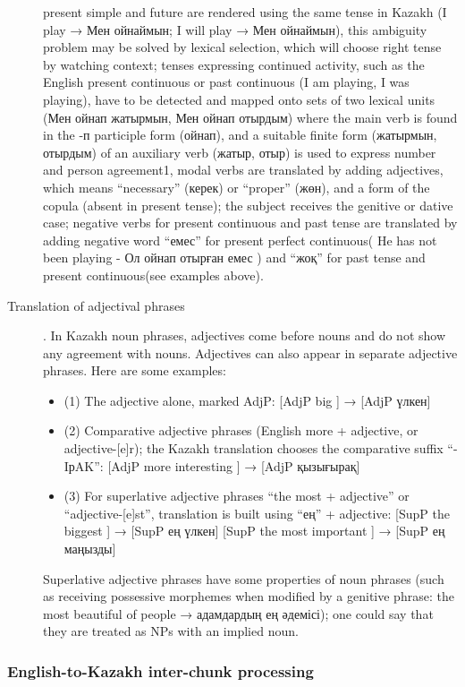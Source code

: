 \documentclass[11pt]{article}
\begin{document}
\begin{description}
present simple and future are rendered using the same tense in Kazakh (I play → Мен ойнаймын;  I will play → Мен ойнаймын), this ambiguity problem may be solved by lexical selection, which will choose right tense by watching context; 
tenses expressing continued activity, such as the English present continuous or past continuous (I am playing, I was playing), have to be detected and mapped onto sets of two lexical units (Мен ойнап жатырмын, Мен ойнап отырдым) where the main verb is found in the -п participle form (ойнап), and a suitable finite form  (жатырмын, отырдым) of an auxiliary verb (жатыр, отыр) is used to express number and person agreement1, 
modal verbs are translated by adding adjectives, which means “necessary” (керек) or “proper” (жөн), and a form of the copula (absent in present tense); the subject receives the genitive or dative case;
negative verbs for present continuous and past tense are translated by adding negative word “емес” for present perfect continuous( He has not been playing - Ол ойнап отырған емес ) and  “жоқ” for past tense and present continuous(see examples above).
\item[Translation of adjectival phrases]. In Kazakh noun phrases, adjectives come before nouns and do not show any agreement with nouns.  Adjectives can also appear in separate adjective phrases. Here are some examples:
\begin{itemize}
\item (1)  The adjective alone, marked AdjP: [AdjP big ] → [AdjP үлкен] 
\item (2)  Comparative adjective phrases  (English more + adjective, or adjective-[e]r); the Kazakh translation chooses the comparative suffix “-{I}р{A}{K}”: [AdjP  more  interesting ]  → [AdjP қызығырақ]
\item (3)  For superlative adjective phrases  “the most + adjective”  or “adjective-[e]st”, translation is built using “ең” + adjective:  [SupP  the biggest ]  → [SupP ең үлкен] [SupP  the most important ]   → [SupP ең маңызды]
\end{itemize}
Superlative adjective phrases have some properties of noun phrases (such as receiving possessive morphemes when modified by a genitive phrase: the most beautiful of people → адамдардың ең әдемісі); one could say that they are treated as NPs with an implied noun.
\end{description}

\subsubsection{English-to-Kazakh inter-chunk processing}
\end{document}
